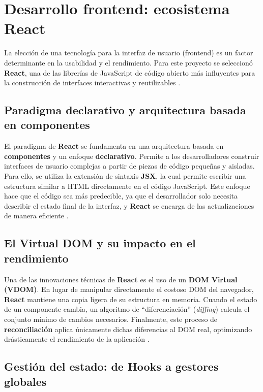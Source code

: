 \documentclass[12pt,letterpaper,spanish]{report}
\begin{document}
\section{Desarrollo frontend: ecosistema React}
\label{sec:desarrollo_frontend}

La elección de una tecnología para la interfaz de usuario (frontend) es un factor determinante en la usabilidad y el rendimiento. Para este proyecto se seleccionó \textbf{React}, una de las librerías de JavaScript de código abierto más influyentes para la construcción de interfaces interactivas y reutilizables \citep{Murgueytio2022}.

\subsection{Paradigma declarativo y arquitectura basada en componentes}
\label{sec:react_paradigma}

El paradigma de \textbf{React} se fundamenta en una arquitectura basada en \textbf{componentes} y un enfoque \textbf{declarativo}. Permite a los desarrolladores construir interfaces de usuario complejas a partir de piezas de código pequeñas y aisladas. Para ello, se utiliza la extensión de sintaxis \textbf{JSX}, la cual permite escribir una estructura similar a HTML directamente en el código JavaScript. Este enfoque hace que el código sea más predecible, ya que el desarrollador solo necesita describir el estado final de la interfaz, y \textbf{React} se encarga de las actualizaciones de manera eficiente \citep{ReactDocs2025, TaipeQuishpe2022}.

\subsection{El Virtual DOM y su impacto en el rendimiento}
\label{sec:react_vdom}

Una de las innovaciones técnicas de \textbf{React} es el uso de un \textbf{DOM Virtual (VDOM)}. En lugar de manipular directamente el costoso DOM del navegador, \textbf{React} mantiene una copia ligera de su estructura en memoria. Cuando el estado de un componente cambia, un algoritmo de ``diferenciación'' (\textit{diffing}) calcula el conjunto mínimo de cambios necesarios. Finalmente, este proceso de \textbf{reconciliación} aplica únicamente dichas diferencias al DOM real, optimizando drásticamente el rendimiento de la aplicación \citep{TaipeQuishpe2022, ReactDocs2025}.

\subsection{Gestión del estado: de Hooks a gestores globales}
\label{sec:react_hooks}
\end{document}
